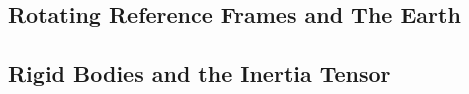 \subsection{Rotating Reference Frames and The Earth}
\subsection{Rigid Bodies and the Inertia Tensor}